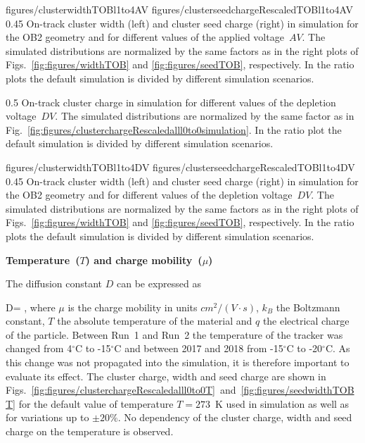                  {figures/clusterwidthTOBl1to4AV}
                 {figures/clusterseedchargeRescaledTOBl1to4AV} %
                 {0.45}       %
                 {  On-track cluster width (left) and cluster seed charge (right) in simulation  for the OB2 geometry and for different values of the applied voltage~$AV$. The simulated distributions are normalized by the same factors as in the right plots of Figs.~\ref{fig:figures/widthTOB} and \ref{fig:figures/seedTOB}, respectively.   In the ratio plots the default simulation is divided by different simulation scenarios. }


                 {0.5}       %
                 {  On-track cluster charge in simulation for different values of the depletion voltage~$DV$.   The simulated distributions are normalized by the same factor as in Fig.~\ref{fig:figures/clusterchargeRescaledalll0to0simulation}.  In the ratio plot the default simulation is divided by different simulation scenarios. }

                 {figures/clusterwidthTOBl1to4DV}
                 {figures/clusterseedchargeRescaledTOBl1to4DV} %
                 {0.45}       %
                 {  On-track cluster width (left) and cluster seed charge (right) in simulation  for the OB2 geometry and for different values of the depletion voltage~$DV$.  The simulated distributions are normalized by the same factors as in the right plots of Figs.~\ref{fig:figures/widthTOB} and \ref{fig:figures/seedTOB}, respectively.   In the ratio plots the default simulation is divided by different simulation scenarios. }

\textbf{Temperature~($T$) and charge mobility~($\mu$)}

The diffusion constant $D$ can be expressed as

{
   D=  ,
}
where $\mu$ is the charge mobility in units $cm^{2}/(V \cdot s)$, $k_{B}$ the Boltzmann constant, $T$ the absolute temperature of the material and $q$ the electrical charge of the particle. Between Run~1 and Run~2 the temperature of the tracker was changed from 4$^{\circ}$C to -15$^{\circ}$C and between 2017 and 2018 from -15$^{\circ}$C to -20$^{\circ}$C. As this change was not propagated into the simulation, it is therefore important to evaluate its effect. The cluster charge, width and seed charge are shown in Figs.~\ref{fig:figures/clusterchargeRescaledalll0to0T}~and~\ref{fig:figures/seedwidthTOBT} for the default value of temperature $T=273$~K used in simulation as well as for variations up to $\pm 20\%$. No dependency of the cluster charge, width and seed charge on the temperature is observed. 

